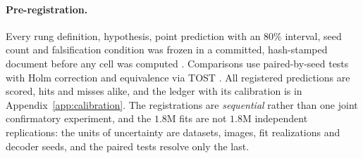 \paragraph{Pre-registration.} Every rung definition, hypothesis, point prediction with an $80\%$
interval, seed count and falsification condition was frozen in a committed, hash-stamped document
before any cell was computed \citep{munafo2017manifesto,nosek2018preregistration}. Comparisons use
paired-by-seed tests with Holm correction \citep{holm1979simple} and equivalence via TOST
\citep{schuirmann1987tost}. All registered predictions are scored, hits and misses alike, and the
ledger with its calibration is in Appendix~\ref{app:calibration}. The registrations are
\emph{sequential} rather than one joint confirmatory experiment, and the $1.8$M fits are not $1.8$M
independent replications: the units of uncertainty are datasets, images, fit realizations and
decoder seeds, and the paired tests resolve only the last.
